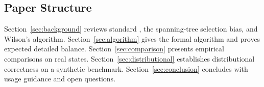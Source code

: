 \subsection{Paper Structure}

Section~\ref{sec:background} reviews standard \recom{}, the spanning-tree
selection bias, and Wilson's \ust{} algorithm.
Section~\ref{sec:algorithm} gives the formal \fr{} algorithm and proves
expected detailed balance.
Section~\ref{sec:comparison} presents empirical comparisons on real states.
Section~\ref{sec:distributional} establishes distributional correctness on
a synthetic benchmark.
Section~\ref{sec:conclusion} concludes with usage guidance and open
questions.
